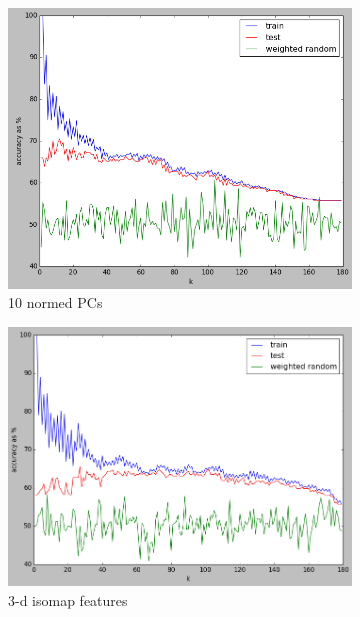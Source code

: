 \documentclass[]{article}
\begin{document}
\begin{figure}[H]
\begin{subfigure}{.32\textwidth}
      \includegraphics[width=1\linewidth]{10pcsnorm.png}
      \caption{10 normed PCs}
    \end{subfigure}
    \begin{subfigure}{.33\textwidth}
      \centering
      \includegraphics[width=1\linewidth]{3isos.png}
      \caption{3-d isomap features}
    \end{subfigure}
    \begin{subfigure}{.32\textwidth}
      \centering

\end{subfigure}
\end{figure}
\end{document}
